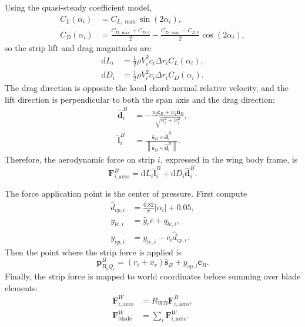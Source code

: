 \documentclass{article}
\newcommand{\D}{\mathrm{d}}
\begin{document}
Using the quasi-steady coefficient model,
\begin{align}
    C_L(\alpha_i)
        &= C_{L,\max}\sin(2\alpha_i), \\
    C_D(\alpha_i)
        &=
        \frac{C_{D,\max}+C_{D,0}}{2}
        -
        \frac{C_{D,\max}-C_{D,0}}{2}
        \cos(2\alpha_i),
\end{align}
so the strip lift and drag magnitudes are
\begin{align}
    \D L_i
        &= \frac{1}{2}\rho V_i^2 c_i \Delta r_i C_L(\alpha_i), \\
    \D D_i
        &= \frac{1}{2}\rho V_i^2 c_i \Delta r_i C_D(\alpha_i).
\end{align}
The drag direction is opposite the local chord-normal relative velocity, and the lift direction is perpendicular to both the span axis and the drag direction:
\begin{align}
    \hat{\mathbf{d}}_i^B
        &=
        -
        \frac{
            u_i\hat{\mathbf{c}}_B
            +
            w_i\hat{\mathbf{n}}_B
        }{
            \sqrt{u_i^2+w_i^2}
        }, \\
    \hat{\mathbf{l}}_i^B
        &=
        \frac{
            \hat{\mathbf{s}}_B
            \times
            \hat{\mathbf{d}}_i^B
        }{
            \left\|
                \hat{\mathbf{s}}_B
                \times
                \hat{\mathbf{d}}_i^B
            \right\|
        }.
\end{align}
Therefore, the aerodynamic force on strip \(i\), expressed in the wing body frame, is
\begin{equation}
    \mathbf{F}_{i,\mathrm{aero}}^{B}
    =
    \D L_i\hat{\mathbf{l}}_i^B
    +
    \D D_i\hat{\mathbf{d}}_i^B.
\end{equation}

The force application point is the center of pressure. First compute
\begin{align}
    \hat{d}_{cp,i}
        &= \frac{0.82}{\pi}|\alpha_i| + 0.05, \\
    y_{le,i}
        &= \hat{y}_r\bar{c} + q_{le,i}, \\
    y_{cp,i}
        &= y_{le,i} - c_i\hat{d}_{cp,i}.
\end{align}
Then the point where the strip force is applied is
\begin{equation}
    \mathbf{p}_{B_oQ_i}^{B}
    =
    (r_i+x_r)\hat{\mathbf{s}}_B
    +
    y_{cp,i}\hat{\mathbf{c}}_B.
\end{equation}
Finally, the strip force is mapped to world coordinates before summing over blade elements:
\begin{align}
    \mathbf{F}_{i,\mathrm{aero}}^{W}
        &= R_{WB}\mathbf{F}_{i,\mathrm{aero}}^{B}, \\
    \mathbf{F}_{\mathrm{blade}}^{W}
        &= \sum_i \mathbf{F}_{i,\mathrm{aero}}^{W}.
\end{align}
\end{document}
